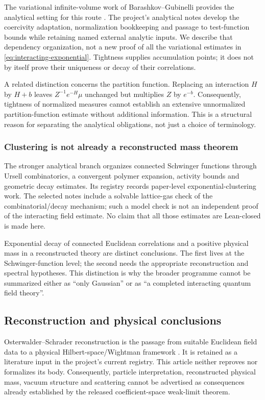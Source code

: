 \documentclass[11pt]{amsart}
\theoremstyle{remark}\newtheorem{remark}[theorem]{Remark}
\begin{document}
The variational infinite-volume work of Barashkov--Gubinelli provides the analytical setting for this route \cite{BG}. The project's analytical notes develop the coercivity adaptation, normalization bookkeeping and passage to test-function bounds while retaining named external analytic inputs. We describe that dependency organization, not a new proof of all the variational estimates in \eqref{eq:interacting-exponential}. Tightness supplies accumulation points; it does not by itself prove their uniqueness or decay of their correlations.

A related distinction concerns the partition function. Replacing an interaction $H$ by $H+b$ leaves $Z^{-1}e^{-H}\mu$ unchanged but multiplies $Z$ by $e^{-b}$. Consequently, tightness of normalized measures cannot establish an extensive unnormalized partition-function estimate without additional information. This is a structural reason for separating the analytical obligations, not just a choice of terminology.

\subsubsection{Clustering is not already a reconstructed mass theorem}
The stronger analytical branch organizes connected Schwinger functions through Ursell combinatorics, a convergent polymer expansion, activity bounds and geometric decay estimates. Its registry records paper-level exponential-clustering work. The selected notes include a solvable lattice-gas check of the combinatorial/decay mechanism; such a model check is not an independent proof of the interacting field estimate. No claim that all those estimates are Lean-closed is made here.

Exponential decay of connected Euclidean correlations and a positive physical mass in a reconstructed theory are distinct conclusions. The first lives at the Schwinger-function level; the second needs the appropriate reconstruction and spectral hypotheses. This distinction is why the broader programme cannot be summarized either as ``only Gaussian'' or as ``a completed interacting quantum field theory''.

\subsection{Reconstruction and physical conclusions}
Osterwalder--Schrader reconstruction is the passage from suitable Euclidean field data to a physical Hilbert-space/Wightman framework \cite{OS1,OS2}. It is retained as a literature input in the project's current registry. This article neither reproves nor formalizes its body. Consequently, particle interpretation, reconstructed physical mass, vacuum structure and scattering cannot be advertised as consequences already established by the released coefficient-space weak-limit theorem.
\end{document}
